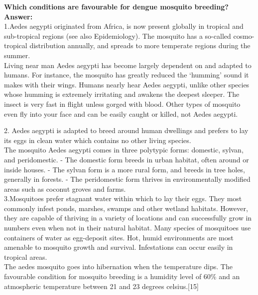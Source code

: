 \documentclass[11pt]{exam}
\begin{document}
\begin{questions}

\question
\label{8. Dengue: Favourable habitats }
\textbf{ Which conditions are favourable for dengue mosquito breeding?}\\
\textbf{Answer:}\\

1.Aedes aegypti originated from Africa, is now present globally in tropical and sub-tropical regions (see also Epidemiology). The mosquito has a so-called cosmo-tropical distribution annually, and spreads to more temperate regions during the summer. \\
Living near man Aedes aegypti has become largely dependent on and adapted to humans. For instance, the mosquito has greatly reduced the `humming' sound it makes with their wings. Humans nearly hear Aedes aegypti, unlike other species whose humming is extremely irritating and awakens the deepest sleeper. The insect is very fast in flight unless gorged with blood. Other types of mosquito even fly into your face and can be easily caught or killed, not Aedes aegypti.

2. Aedes aegypti is adapted to breed around human dwellings and prefers to lay its eggs in clean water which contains no other living species. \\
The mosquito Aedes aegypti comes in three polytypic forms: domestic, sylvan, and peridomestic.
- The domestic form breeds in urban habitat, often around or inside houses.
- The sylvan form is a more rural form, and breeds in tree holes, generally in forests.
- The peridomestic form thrives in environmentally modified areas such as coconut groves and farms.\\

3.Mosquitoes prefer stagnant water within which to lay their eggs. They most commonly infest ponds, marshes, swamps and other wetland habitats. However, they are capable of thriving in a variety of locations and can successfully grow in numbers even when not in their natural habitat. Many species of mosquitoes use containers of water as egg-deposit sites.
Hot, humid environments are most amenable to mosquito growth and survival. Infestations can occur easily in tropical areas. \\ %
The aedes mosquito goes into hibernation when the temperature dips. The favourable condition for mosquito breeding is a humidity level of 60\% and an atmospheric temperature between 21 and 23 degrees celsius.[15]


\end{questions}
\end{document}
